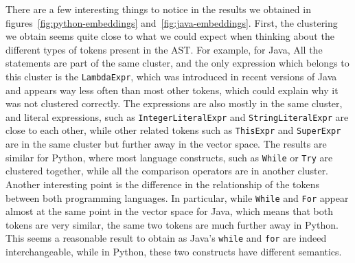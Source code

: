 There are a few interesting things to notice in the results we obtained in
figures~\ref{fig:python-embeddings} and~\ref{fig:java-embeddings}. First, the
clustering we obtain seems quite close to what we could expect when thinking
about the different types of tokens present in the AST. For example, for Java,
All the statements are part of the same cluster, and the only expression which
belongs to this cluster is the \lstinline{LambdaExpr}, which was introduced
in recent versions of Java and appears way less often than most other tokens,
which could explain why it was not clustered correctly. The expressions are also
mostly in the same cluster, and literal expressions, such as
\lstinline{IntegerLiteralExpr} and \lstinline{StringLiteralExpr} are close to
each other, while other related tokens such as \lstinline{ThisExpr} and
\lstinline{SuperExpr} are in the same cluster but further away in the vector
space. The results are similar for Python, where most language constructs, such
as \lstinline{While} or \lstinline{Try} are clustered together, while all the
comparison operators are in another cluster.
Another interesting point is the difference in the relationship of the tokens
between both programming languages. In particular, while \lstinline{While} and
\lstinline{For} appear almost at the same point in the vector space for Java,
which means that both tokens are very similar, the same two tokens are
much further away in Python. This seems a reasonable result to obtain as Java's
\lstinline{while} and \lstinline{for} are indeed interchangeable, while in
Python, these two constructs have different semantics.
